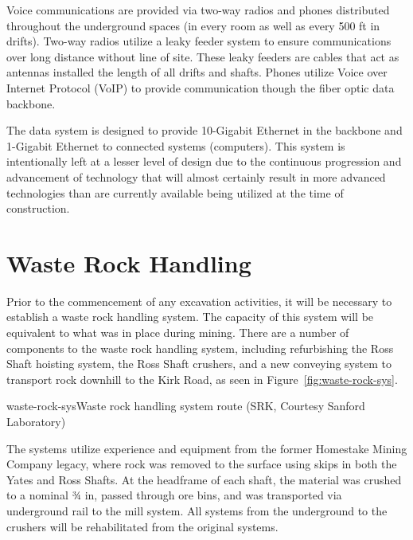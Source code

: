 Voice communications are provided via two-way radios and phones distributed throughout the underground spaces (in every room as well as every 500 ft in drifts). Two-way radios utilize a leaky feeder system to ensure communications over long distance without line of site. These leaky feeders are cables that act as antennas installed the length of all drifts and shafts. Phones utilize Voice over Internet Protocol (VoIP) to provide communication though the fiber optic data backbone.

The data system is designed to provide 10-Gigabit Ethernet in the backbone and 1-Gigabit Ethernet to connected systems (computers). This system is intentionally left at a lesser level of design due to the continuous progression and advancement of technology that will almost certainly result in more advanced technologies than are currently available being utilized at the time of construction.

\section{Waste Rock Handling }
\label{sec:fscf-und-waste-rock}

Prior to the commencement of any excavation activities, it will be necessary to establish a waste rock handling system. The capacity of this system will be equivalent to what was in place during mining. 
There are a number of components to the waste rock handling system, including refurbishing the Ross Shaft hoisting system, the Ross Shaft crushers, and a new conveying system to transport rock downhill to the Kirk Road, as seen in Figure~\ref{fig:waste-rock-sys}. 

\begin{cdrfigure}{waste-rock-sys}{Waste rock handling system route (SRK, Courtesy Sanford Laboratory)}
\end{cdrfigure}

The systems utilize experience and equipment from the former Homestake Mining Company legacy, where rock was removed to the surface using skips in both the Yates and Ross Shafts. At the headframe of each shaft, the material was crushed to a nominal ¾ in, passed through ore bins, and was transported via underground rail to the mill system. All systems from the underground to the crushers will be rehabilitated from the original systems.

